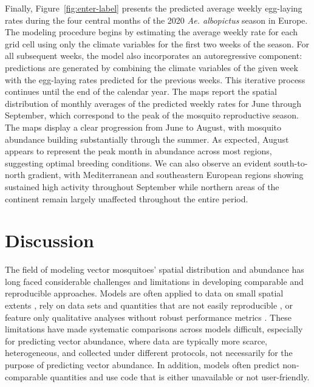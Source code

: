 \documentclass[preprint,12pt]{elsarticle}
\begin{document}
Finally, Figure~\ref{fig:enter-label} presents the predicted average weekly egg-laying rates during the four central months of the 2020 \textit{Ae. albopictus} season in Europe. The modeling procedure begins by estimating the average weekly rate for each grid cell using only the climate variables for the first two weeks of the season. For all subsequent weeks, the model also incorporates an autoregressive component: predictions are generated by combining the climate variables of the given week with the egg-laying rates predicted for the previous weeks. This iterative process continues until the end of the calendar year. The maps report the spatial distribution of monthly averages of the predicted weekly rates for June through September, which correspond to the peak of the mosquito reproductive season. The maps display a clear progression from June to August, with mosquito abundance building substantially through the summer. As expected, August appears to represent the peak month in abundance across most regions, suggesting optimal breeding conditions. We can also observe an evident south-to-north gradient, with Mediterranean and southeastern European regions showing sustained high activity throughout September while northern areas of the continent remain largely unaffected throughout the entire period.\\




\section{Discussion}

The field of modeling vector mosquitoes' spatial distribution and abundance has long faced considerable challenges and limitations in developing comparable and reproducible approaches. Models are often applied to data on small spatial extents \cite{guzzetta2016, Kioutsioukis2019, angelou2021, dare2022, dare2025, kinney2024rapid}, rely on data sets and quantities that are not easily reproducible \cite{li2019}, or feature only qualitative analyses without robust performance metrics \cite{davis2024, zardini2024}. These limitations have made systematic comparisons across models difficult, especially for predicting vector abundance, where data are typically more scarce, heterogeneous, and collected under different protocols, not necessarily for the purpose of predicting vector abundance. In addition, models often predict non-comparable quantities and use code that is either unavailable or not user-friendly.
\end{document}
